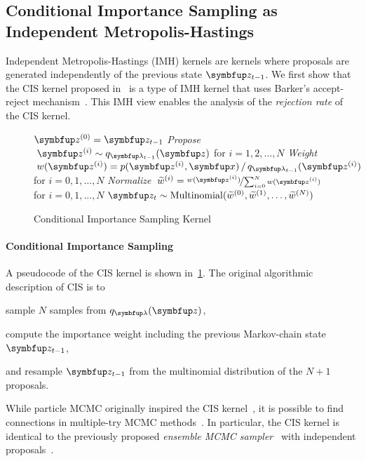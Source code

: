 \subsection{Conditional Importance Sampling as Independent Metropolis-Hastings}\label{section:cis_imh}
Independent Metropolis-Hastings (IMH) kernels are kernels where proposals are generated independently of the previous state \(\vz_{t-1}\).
We first show that the CIS kernel proposed in~\citep{NEURIPS2020_b2070693} is a type of IMH kernel that uses Barker's accept-reject mechanism~\citep{barker_monte_1965}.
This IMH view enables the analysis of the \textit{rejection rate} of the CIS kernel.

\begin{figure}
  \small
  \begin{algorithm2e}[H]
    \DontPrintSemicolon
    \SetAlgoLined
    \(\vz^{(0)} = \vz_{t-1}\) \;
    \textit{Propose} \(\;\vz^{(i)} \sim q_{\vlambda_{t-1}}(\vz)\) for \(i = 1, 2,\ldots, N\) \;
    \textit{Weight} \(\;w(\vz^{(i)}) = p(\vz^{(i)},\vx) \,/\, q_{\vlambda_{t-1}}(\vz^{(i)}) \) for \(i = 0, 1,\ldots, N\)\;
    \textit{Normalize} \(\;\widetilde{w}^{(i)} = \nicefrac{w(\vz^{(i)})}{ \sum^{N}_{i=0} w(\vz^{(i)}) }\) for \(i = 0, 1,\ldots, N\)\;
    \(\vz_{t} \sim \mathrm{Multinomial}(\widetilde{w}^{(0)}, \widetilde{w}^{(1)}, \ldots, \widetilde{w}^{(N)}) \)\;
    \caption{Conditional Importance Sampling Kernel}\label{alg:cis}
  \end{algorithm2e}
  \vspace{-0.15in}
\end{figure}
%
\vspace{-0.1in}
\paragraph{Conditional Importance Sampling}
A pseudocode of the CIS kernel is shown in~\cref{alg:cis}.
The original algorithmic description of CIS is to
\begin{enumerate*}[label=(\roman*)]
  \item sample \(N\) samples from \(q_{\vlambda}(\vz)\),
  \item compute the importance weight including the previous Markov-chain state \(\vz_{t-1}\),
  \item and resample \(\vz_{t-1}\) from the multinomial distribution of the \(N+1\) proposals.
\end{enumerate*}
%
While particle MCMC originally inspired the CIS kernel~\citep{andrieu_particle_2010}, it is possible to find connections in multiple-try MCMC methods~\citep{martino_review_2018}.
In particular, the CIS kernel is identical to the previously proposed \textit{ensemble MCMC sampler}~\citep{austad_parallel_2007, neal_mcmc_2011a} with independent proposals~\citep[Table 12]{martino_review_2018}.

